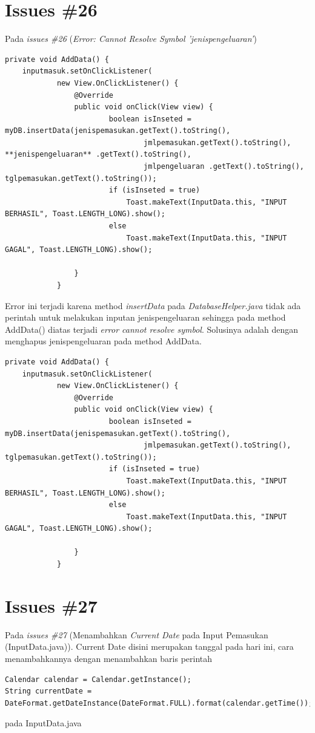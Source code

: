 \section{Issues \#26} 
Pada \textit{issues \#26} (\textit{Error: Cannot Resolve Symbol 'jenispengeluaran'})
\begin{verbatim}
private void AddData() {
    inputmasuk.setOnClickListener(
            new View.OnClickListener() {
                @Override
                public void onClick(View view) {
                        boolean isInseted = myDB.insertData(jenispemasukan.getText().toString(),
                                jmlpemasukan.getText().toString(), **jenispengeluaran** .getText().toString(),
                                jmlpengeluaran .getText().toString(), tglpemasukan.getText().toString());
                        if (isInseted = true)
                            Toast.makeText(InputData.this, "INPUT BERHASIL", Toast.LENGTH_LONG).show();
                        else
                            Toast.makeText(InputData.this, "INPUT GAGAL", Toast.LENGTH_LONG).show();

                }
            }
\end{verbatim}
Error ini terjadi karena method \textit{insertData} pada \textit{DatabaseHelper.java} tidak ada perintah untuk melakukan inputan jenispengeluaran sehingga pada method AddData() diatas terjadi \textit{error cannot resolve symbol}. Solusinya adalah dengan menghapus jenispengeluaran pada method AddData.
\begin{verbatim}
private void AddData() {
    inputmasuk.setOnClickListener(
            new View.OnClickListener() {
                @Override
                public void onClick(View view) {
                        boolean isInseted = myDB.insertData(jenispemasukan.getText().toString(),
                                jmlpemasukan.getText().toString(), tglpemasukan.getText().toString());
                        if (isInseted = true)
                            Toast.makeText(InputData.this, "INPUT BERHASIL", Toast.LENGTH_LONG).show();
                        else
                            Toast.makeText(InputData.this, "INPUT GAGAL", Toast.LENGTH_LONG).show();

                }
            }
\end{verbatim}

\section{Issues \#27}
Pada \textit{issues \#27} (Menambahkan \textit{Current Date} pada Input Pemasukan (InputData.java)). Current Date disini merupakan tanggal pada hari ini, cara menambahkannya dengan menambahkan baris perintah
\begin{verbatim}
Calendar calendar = Calendar.getInstance();
String currentDate = DateFormat.getDateInstance(DateFormat.FULL).format(calendar.getTime());
\end{verbatim}
pada InputData.java

